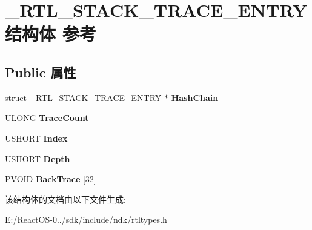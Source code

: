 \hypertarget{struct___r_t_l___s_t_a_c_k___t_r_a_c_e___e_n_t_r_y}{}\section{\+\_\+\+R\+T\+L\+\_\+\+S\+T\+A\+C\+K\+\_\+\+T\+R\+A\+C\+E\+\_\+\+E\+N\+T\+R\+Y结构体 参考}
\label{struct___r_t_l___s_t_a_c_k___t_r_a_c_e___e_n_t_r_y}
\subsection*{Public 属性}
\begin{DoxyCompactItemize}
\item 
\mbox{\label{struct___r_t_l___s_t_a_c_k___t_r_a_c_e___e_n_t_r_y_adcf01a87727045ee49d08bcf9e54f0bd}} 
\hyperlink{interfacestruct}{struct} \hyperlink{struct___r_t_l___s_t_a_c_k___t_r_a_c_e___e_n_t_r_y}{\+\_\+\+R\+T\+L\+\_\+\+S\+T\+A\+C\+K\+\_\+\+T\+R\+A\+C\+E\+\_\+\+E\+N\+T\+RY} $\ast$ {\bfseries Hash\+Chain}
\item 
\mbox{\label{struct___r_t_l___s_t_a_c_k___t_r_a_c_e___e_n_t_r_y_a4189361bcd5805e986e3fa4abaa6d2bd}} 
U\+L\+O\+NG {\bfseries Trace\+Count}
\item 
\mbox{\label{struct___r_t_l___s_t_a_c_k___t_r_a_c_e___e_n_t_r_y_a5b6142a34c2deb138093d6e997b47078}} 
U\+S\+H\+O\+RT {\bfseries Index}
\item 
\mbox{\label{struct___r_t_l___s_t_a_c_k___t_r_a_c_e___e_n_t_r_y_a70473634bdc86bdf86494d7db5050afb}} 
U\+S\+H\+O\+RT {\bfseries Depth}
\item 
\mbox{\label{struct___r_t_l___s_t_a_c_k___t_r_a_c_e___e_n_t_r_y_a034faa4158bf81543d55d7fd77fde4d6}} 
\hyperlink{interfacevoid}{P\+V\+O\+ID} {\bfseries Back\+Trace} \mbox{[}32\mbox{]}
\end{DoxyCompactItemize}


该结构体的文档由以下文件生成\+:\begin{DoxyCompactItemize}
\item 
E\+:/\+React\+O\+S-\/0../sdk/include/ndk/rtltypes.\+h\end{DoxyCompactItemize}

